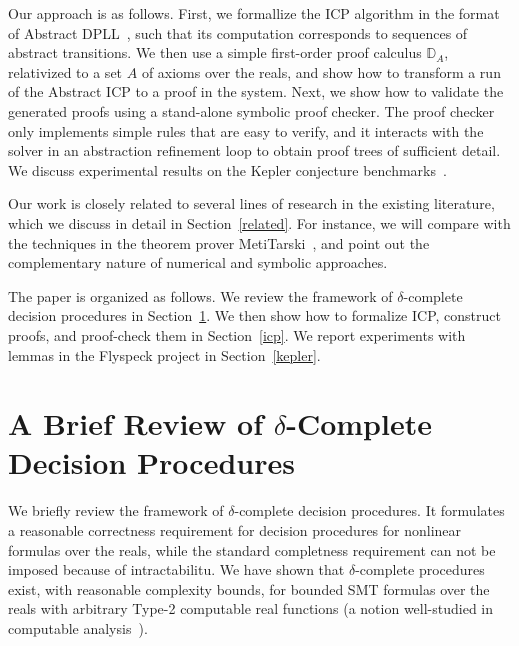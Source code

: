 \documentclass[envcountsect]{llncs}
\begin{document}
Our approach is as follows. First, we formallize the ICP algorithm in the
format of Abstract DPLL~\cite{}, such that its computation corresponds to
sequences of abstract transitions. We then use a simple first-order proof
calculus $\mathbb{D}_A$, relativized to a set $A$ of axioms over the reals, and
show how to transform a run of the Abstract ICP to a proof in the system. Next,
we show how to validate the generated proofs using a stand-alone symbolic proof
checker. The proof checker only implements simple rules that are easy to verify,
and it interacts with the solver in an abstraction refinement loop to obtain
proof trees of sufficient detail. We discuss experimental results on the Kepler
conjecture benchmarks~\cite{}.

Our work is closely related to several lines
of research in the existing literature, which we discuss in detail in
Section~\ref{related}. For instance, we will compare with the techniques
in the theorem prover MetiTarski~\cite{}, and point out the
complementary nature of numerical and symbolic approaches.

The paper is organized as follows. We review the framework of $\delta$-complete
decision procedures in Section~\ref{review}. We then show how to formalize ICP,
construct proofs, and proof-check them in Section~\ref{icp}. We
report experiments with lemmas in the Flyspeck project in Section~\ref{kepler}.


\section{A Brief Review of $\delta$-Complete Decision Procedures}\label{review}

We briefly review the framework of $\delta$-complete decision procedures.
It formulates a reasonable correctness requirement for decision
procedures for nonlinear
formulas over the reals, while the standard completness requirement can not be
imposed because of intractabilitu. We have shown that $\delta$-complete
procedures exist,
with reasonable complexity bounds, for bounded SMT formulas over the reals with
arbitrary Type-2 computable real functions (a notion well-studied in computable
analysis~\cite{}).
\end{document}
